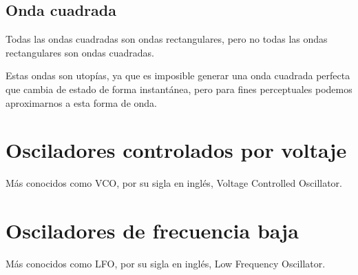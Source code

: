 \documentclass[../principal.tex]{subfiles}
\begin{document}

\subsection{Onda cuadrada}

Todas las ondas cuadradas son ondas rectangulares, pero no todas las ondas rectangulares son ondas cuadradas.

Estas ondas son utopías, ya que es imposible generar una onda cuadrada perfecta que cambia de estado de forma instantánea, pero para fines perceptuales podemos aproximarnos a esta forma de onda.



\section{Osciladores controlados por voltaje}

Más conocidos como VCO, por su sigla en inglés, Voltage Controlled Oscillator.

\section{Osciladores de frecuencia baja}

Más conocidos como LFO, por su sigla en inglés, Low Frequency Oscillator.

\newpage
\end{document}
